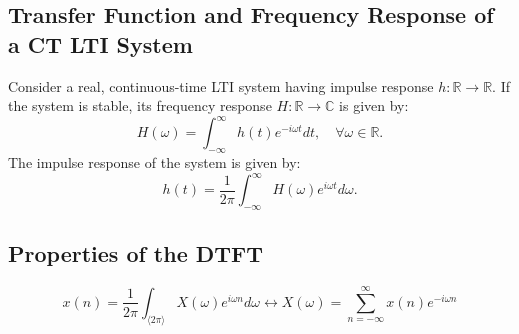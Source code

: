 \subsection{Transfer Function and Frequency Response of a CT LTI System}
Consider a real, continuous-time LTI system having impulse response $h: \mathbb{R} \rightarrow \mathbb{R}$.
If the system is stable, its frequency response $H: \mathbb{R} \rightarrow \mathbb{C}$ is given by:
$$
H(\omega)=\int_{-\infty}^{\infty} h(t) e^{-i \omega t} d t, \quad \forall \omega \in \mathbb{R} .
$$
The impulse response of the system is given by:
$$
h(t)=\frac{1}{2 \pi} \int_{-\infty}^{\infty} H(\omega) e^{i \omega t} d \omega .
$$

\newpage
\subsection{Properties of the DTFT}
\[
    \boxed{
        x(n)=\frac{1}{2 \pi} \int_{\langle 2 \pi\rangle} X(\omega) e^{i \omega n} d \omega \longleftrightarrow X(\omega)=\sum_{n=-\infty}^{\infty} x(n) e^{-i \omega n}
    }
\]
